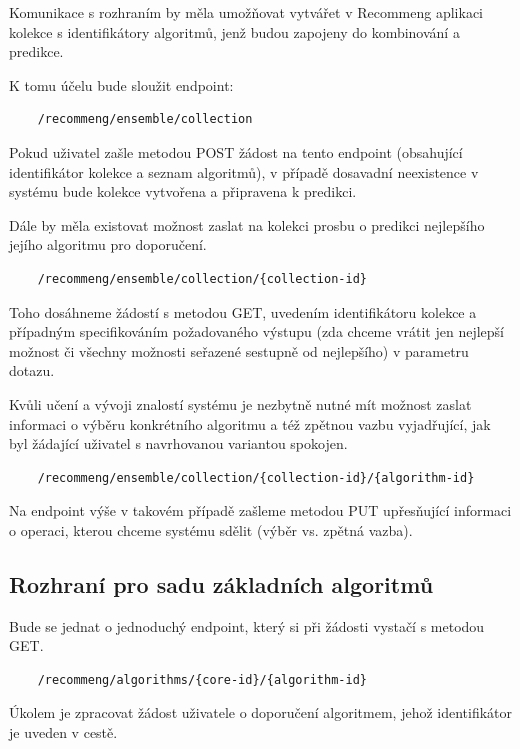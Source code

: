 \documentclass[thesis=M,czech]{FITthesis}[2014/05/07]
\begin{document}
Komunikace s rozhraním by měla umožňovat vytvářet v Recommeng aplikaci kolekce s identifikátory algoritmů, jenž budou zapojeny do kombinování a predikce. 

K tomu účelu bude sloužit endpoint:

\begin{verbatim}
	/recommeng/ensemble/collection
\end{verbatim}

Pokud uživatel zašle metodou POST žádost na tento endpoint (obsahující identifikátor kolekce a seznam algoritmů), v případě dosavadní neexistence v systému bude kolekce vytvořena a připravena k predikci. 

Dále by měla existovat možnost zaslat na kolekci prosbu o predikci nejlepšího jejího algoritmu pro doporučení.

\begin{verbatim}
	/recommeng/ensemble/collection/{collection-id}
\end{verbatim}

Toho dosáhneme žádostí s metodou GET, uvedením identifikátoru kolekce a případným specifikováním požadovaného výstupu (zda chceme vrátit jen nejlepší možnost či všechny možnosti seřazené sestupně od nejlepšího) v parametru dotazu.

Kvůli učení a vývoji znalostí systému je nezbytně nutné mít možnost zaslat informaci o výběru konkrétního algoritmu a též zpětnou vazbu vyjadřující, jak byl žádající uživatel s navrhovanou variantou spokojen.

\begin{verbatim}
	/recommeng/ensemble/collection/{collection-id}/{algorithm-id}
\end{verbatim}

Na endpoint výše v takovém případě zašleme metodou PUT upřesňující informaci o operaci, kterou chceme systému sdělit (výběr vs. zpětná vazba).

\subsection{Rozhraní pro sadu základních algoritmů}

Bude se jednat o jednoduchý endpoint, který si při žádosti vystačí s metodou GET.

\begin{verbatim}
	/recommeng/algorithms/{core-id}/{algorithm-id}
\end{verbatim}

Úkolem je zpracovat žádost uživatele o doporučení algoritmem, jehož identifikátor je uveden v cestě. 
\end{document}
